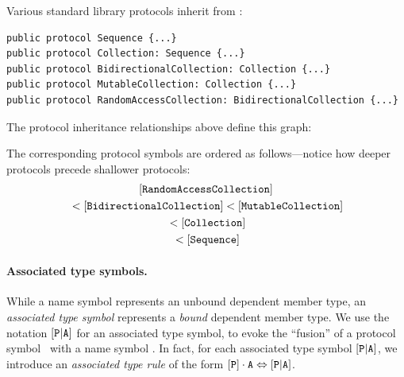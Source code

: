 \documentclass[../generics]{subfiles}
\begin{document}
\begin{example}\label{protocol reduction order example}
Various standard library protocols inherit from \tSequence:
\begin{Verbatim}
public protocol Sequence {...}
public protocol Collection: Sequence {...}
public protocol BidirectionalCollection: Collection {...}
public protocol MutableCollection: Collection {...}
public protocol RandomAccessCollection: BidirectionalCollection {...}
\end{Verbatim}
The protocol inheritance relationships above define this graph:
\begin{center}
\end{center}
The corresponding protocol symbols are ordered as follows---notice how deeper protocols precede shallower protocols:
\begin{gather*}
[\texttt{RandomAccessCollection}]\\
{} < [\texttt{BidirectionalCollection}]<[\texttt{MutableCollection}]\\
{} < [\texttt{Collection}]\\
{} < [\texttt{Sequence}]
\end{gather*}
\end{example}

\paragraph{Associated type symbols.}
While a name symbol represents an unbound dependent member type, an \emph{associated type symbol} represents a \emph{bound} dependent member type. We use the notation $[\texttt{P}|\texttt{A}]$ for an associated type symbol, to evoke the ``fusion'' of a protocol symbol \pP\ with a name symbol \nA. In fact, for each associated type symbol $[\texttt{P}|\texttt{A}]$, we introduce an \emph{associated type rule} of the form $[\texttt{P}]\cdot\texttt{A}\Leftrightarrow[\texttt{P}|\texttt{A}]$.
\end{document}
